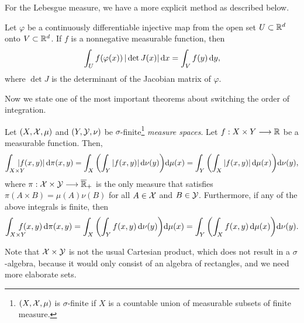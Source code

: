 For the Lebesgue measure, we have a more explicit method as described below.
\begin{theorem}
    Let $\varphi$ be a continuously differentiable %
    injective map from the open set $U\subset\R^d$ onto $V\subset\R^d$.
    If $f$ is a nonnegative measurable function, then \vspace{-5mm}
    \begin{align*}
        \int_{U} f(\varphi(x))\,|\det J(x)| \,\d x = \int_{V} f(y)\,\d y,
    \end{align*}
    where $\det J$ is the determinant of the Jacobian matrix of $\varphi$.
\end{theorem}

Now we state one of the most important theorems about switching the order of integration.
\begin{theorem} \label{th:fubini-tonelli}
    Let $(X,\cal X, \mu)$ and $(Y,\cal Y, \nu)$ be $\sigma$-finite\footnote{$(X,\cal X, \mu)$ is $\sigma$-finite if $X$ is a countable union of measurable subsets of finite measure.} \textit{measure spaces}. Let $f:X\times Y\longrightarrow \R$ be a measurable function. Then,
    \begin{align*}
        \int_{X\times Y}\hspace{-4mm} |f(x,y)| \,\d\pi(x,y) = \int_X\left(\int_Y |f(x,y)| \,\d\nu(y)\right)\!\d \mu(x)  = \int_Y\left(\int_X |f(x,y)| \,\d\mu(x)\right)\!\d \nu(y),
    \end{align*}
    where $\pi:\cal X\times \cal Y\longrightarrow \overline{\R}_+$ is the only measure that satisfies $\pi(A\times B) = \mu(A)\nu(B)$ for all $A\in\cal X$ and $B\in\cal Y$. Furthermore, if any of the above integrals is finite, then
    \begin{align*}
        \int_{X\times Y}\hspace{-4mm} f(x,y) \,\d\pi(x,y) = \int_X\left(\int_Y f(x,y) \,\d\nu(y)\right)\!\d \mu(x)  = \int_Y\left(\int_X f(x,y) \,\d\mu(x)\right)\!\d \nu(y).
    \end{align*}
\end{theorem}

Note that $\cal X\times \cal Y$ is not the usual Cartesian product, which does not result in a $\sigma$-algebra, because it would only consist of an algebra of rectangles, and we need more elaborate sets.


